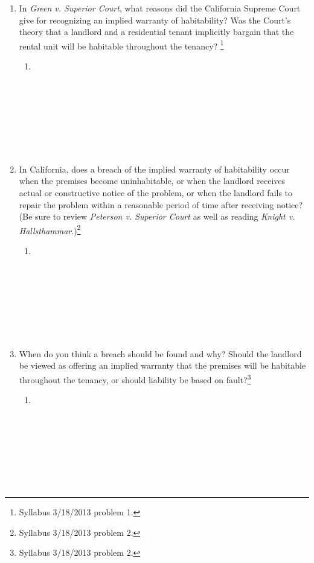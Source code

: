 \begin{enumerate}
    \item In \emph{Green v. Superior Court}, what reasons did the California 
    Supreme Court give for recognizing an implied warranty of habitability?  
    Was the Court's theory that a landlord and a residential tenant implicitly 
    bargain that the rental unit will be habitable throughout the tenancy?  
    \footnote{Syllabus 3/18/2013 problem 1.}
    \begin{enumerate}
        \item %
        ~\\\\\\\\\\\\\\\\
    \end{enumerate}
    \item In California, does a breach of the implied warranty of habitability 
    occur when the premises become uninhabitable, or when the landlord 
    receives actual or constructive notice of the problem, or when the 
    landlord fails to repair the problem within a reasonable period of time 
    after receiving notice? (Be sure to review \emph{Peterson v. Superior 
    Court} as well as reading \emph{Knight v. 
    Hallsthammar}.)\footnote{Syllabus 3/18/2013 problem 2.}
    \begin{enumerate}
        \item %
        ~\\\\\\\\\\\\\\\\
    \end{enumerate}
    \item When do you think a breach should be found and why?  Should the 
    landlord be viewed as offering an implied warranty that the premises will 
    be habitable throughout the tenancy, or should liability be based on 
    fault?\footnote{Syllabus 3/18/2013 problem 2.}
    \begin{enumerate}
        \item %
        ~\\\\\\\\\\\\\\\\
    \end{enumerate}
\end{enumerate}


